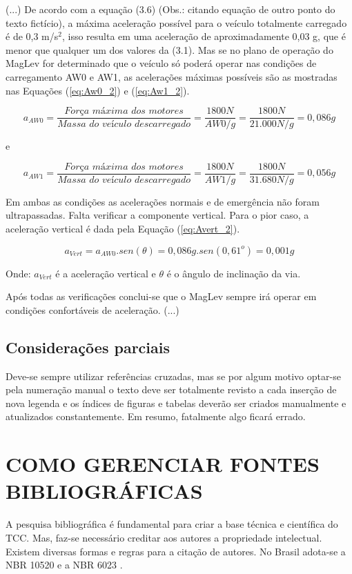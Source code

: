 \documentclass[
        oneside,      %
        english,			
        brazil			 
        ]{configcefetmglpd}
\begin{document}
(...) De acordo com a equação (3.6) (Obs.: citando equação de outro ponto do texto fictício), a máxima aceleração possível para o veículo totalmente carregado é de 0,3 m/s$^2$, isso resulta em uma aceleração de aproximadamente 0,03 g, que é menor que qualquer um dos valores da (3.1). Mas se no plano de operação do MagLev for determinado que o veículo só poderá operar nas condições de carregamento AW0 e AW1, as acelerações máximas possíveis são as mostradas nas Equações (\ref{eq:Aw0_2}) e (\ref{eq:Aw1_2}).

\begin{equation}
	\label{eq:Aw0_2}
	a_{AW0} = \frac{\textit{Força~máxima~dos~motores}}{\textit{Massa~do~veículo~descarregado}} = \frac{1800N}{AW0/g}
	=\frac{1800N}{21.000N/g}=0,086g
\end{equation}

e

\begin{equation}
	\label{eq:Aw1_2}
	a_{AW1} = \frac{\textit{Força~máxima~dos~motores}}{\textit{Massa~do~veículo~descarregado}} = \frac{1800N}{AW1/g}
	=\frac{1800N}{31.680N/g}=0,056g
\end{equation}

Em ambas as condições as acelerações normais e de emergência não foram ultrapassadas. Falta verificar a componente vertical. Para o pior caso, a aceleração vertical é dada pela Equação (\ref{eq:Avert_2}).

\begin{equation}
	\label{eq:Avert_2}
	a_{Vert} = a_{AW0}.sen(\theta)=0,086g.sen(0,61^o)=0,001g
\end{equation}

Onde: $a_{Vert}$ é a aceleração vertical e $\theta$ é o ângulo de inclinação da via.

Após todas as verificações conclui-se que o MagLev sempre irá operar em condições confortáveis de aceleração. (...)

\section{Considerações parciais}
Deve-se sempre utilizar referências cruzadas, mas se por algum motivo optar-se pela numeração manual o texto deve ser totalmente revisto a cada inserção de nova legenda e os índices de figuras e tabelas deverão ser criados manualmente e atualizados constantemente. Em resumo, fatalmente algo ficará errado.

\chapter{COMO GERENCIAR FONTES BIBLIOGRÁFICAS}
A pesquisa bibliográfica é fundamental para criar a base técnica e científica do TCC. Mas, faz-se necessário creditar aos autores a propriedade intelectual. Existem diversas formas e regras para a citação de autores. No Brasil adota-se a NBR 10520 \cite{bib:abnt10520} e a NBR 6023 \cite{bib:abnt6023}.
\end{document}

